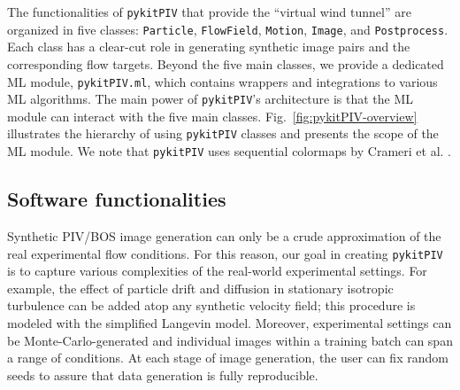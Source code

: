 \documentclass[a4paper,fleqn]{cas-dc}
\begin{document}
The functionalities of \texttt{pykitPIV} that provide the ``virtual wind tunnel'' are organized in five classes: \texttt{Particle}, \texttt{FlowField}, \texttt{Motion}, \texttt{Image}, and \texttt{Postprocess}. Each class has a clear-cut role in generating synthetic image pairs and the corresponding flow targets. Beyond the five main classes, we provide a dedicated ML module, \texttt{pykitPIV.ml}, which contains wrappers and integrations to various ML algorithms. The main power of \texttt{pykitPIV}'s architecture is that the ML module can interact with the five main classes. Fig.~\ref{fig:pykitPIV-overview} illustrates the hierarchy of using \texttt{pykitPIV} classes and presents the scope of the ML module. We note that \texttt{pykitPIV} uses sequential colormaps by Crameri et al. \cite{crameri2020misuse}.

\subsection{Software functionalities}

Synthetic PIV/BOS image generation can only be a crude approximation of the real experimental flow conditions. For this reason, our goal in creating \texttt{pykitPIV} is to capture various complexities of the real-world experimental settings. For example, the effect of particle drift and diffusion in stationary isotropic turbulence can be added atop any synthetic velocity field; this procedure is modeled with the simplified Langevin model. Moreover, experimental settings can be Monte-Carlo-generated and individual images within a training batch can span a range of conditions. At each stage of image generation, the user can fix random seeds to assure that data generation is fully reproducible. 
\end{document}
